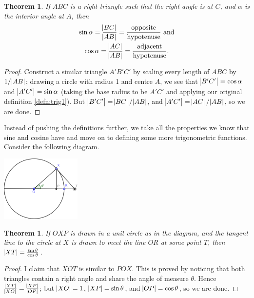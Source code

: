 \documentclass[a4paper,leqno]{article}
\numberwithin{equation}{section}
\newtheorem{thm}[equation]{Theorem}
\theoremstyle{definition}
\theoremstyle{remark}
\begin{document}
\begin{thm}\label{thm:ratios}
  If $ ABC $ is a right triangle such that the right angle is at $ C $, and $ \alpha $ is the interior angle at $ A $, then
    \begin{gather}
      \sin \alpha = \frac{\abs{BC}}{\abs{AB}} = \frac{\text{opposite}}{\text{hypotenuse}} \text{ and}\\
      \cos \alpha = \frac{\abs{AC}}{\abs{AB}} = \frac{\text{adjacent}}{\text{hypotenuse}}.
    \end{gather}
\end{thm}
\begin{proof}
  Construct a similar triangle $ A'B'C' $ by scaling every length of $ ABC $ by $ 1/\abs{AB} $; drawing a circle
  with radius 1 and centre $ A $, we see that $ \abs{B'C'} = \cos \alpha $ and $ \abs{A'C'} = \sin \alpha $ (taking
  the base radius to be $ A'C' $ and applying our original definition \ref{defn:trig1}). But $ \abs{B'C'} = \abs{BC}/\abs{AB} $,
  and $ \abs{A'C'} = \abs{AC}/\abs{AB} $, so we are done.
\end{proof}

Instead of pushing the definitions further, we take all the properties we know that sine and cosine have and move on to
defining some more trigonometric functions. Consider the following diagram.

\begin{center}
  \includegraphics[width=0.3\textwidth]{tangent}
\end{center}

\begin{thm}
  If $ OXP $ is drawn in a unit circle as in the diagram, and the tangent line to the circle at $ X $ is drawn to meet the line $ OR $ at
  some point $ T $, then $ \abs{XT} = \frac{\sin \theta}{\cos \theta} $.
\end{thm}
\begin{proof}
  I claim that $ XOT $ is similar to $ POX $. This is proved by noticing that both triangles
  contain a right angle and share the angle of measure $ \theta $. Hence $ \frac{\abs{XT}}{\abs{XO}} = \frac{\abs{XP}}{\abs{OP}} $;
  but $ \abs{XO} = 1 $, $ \abs{XP} = \sin \theta $, and $ \abs{OP} = \cos \theta $, so we are done.
\end{proof}
\end{document}
